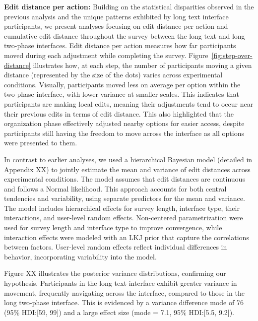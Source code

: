 \textbf{Edit distance per action:} Building on the statistical disparities observed in the previous analysis and the unique patterns exhibited by long text interface participants, we present analyses focusing on edit distance per action and cumulative edit distance throughout the survey between the long text and long two-phase interfaces. Edit distance per action measures how far participants moved during each adjustment while completing the survey.  Figure~\ref{fig:step-over-distance} illustrates how, at each step, the number of participants moving a given distance (represented by the size of the dots) varies across experimental conditions. Visually, participants moved less on average per option within the two-phase interface, with lower variance at smaller scales. This indicates that participants are making local edits, meaning their adjustments tend to occur near their previous edits in terms of edit distance. This also highlighted that the organization phase effectively adjusted nearby options for easier access, despite participants still having the freedom to move across the interface as all options were presented to them.

In contrast to earlier analyses, we used a hierarchical Bayesian model (detailed in Appendix XX) to jointly estimate the mean and variance of edit distances across experimental conditions. The model assumes that edit distances are continuous and follows a Normal likelihood. This approach accounts for both central tendencies and variability, using separate predictors for the mean and variance. The model includes hierarchical effects for survey length, interface type, their interactions, and user-level random effects. Non-centered parametrization were used for survey length and interface type to improve convergence, while interaction effects were modeled with an LKJ prior that capture the correlations between factors. User-level random effects reflect individual differences in behavior, incorporating variability into the model.

Figure XX illustrates the posterior variance distributions, confirming our hypothesis. Participants in the long text interface exhibit greater variance in movement, frequently navigating across the interface, compared to those in the long two-phase interface. This is evidenced by a variance difference mode of 76 (95\% HDI:[59, 99]) and a large effect size (mode = 7.1, 95\% HDI:[5.5, 9.2]).

